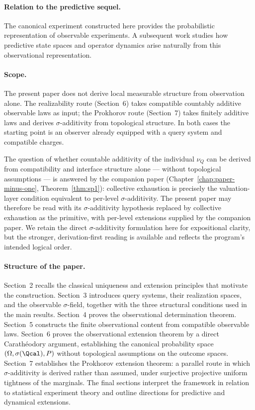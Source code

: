 \paragraph{Relation to the predictive sequel.}
The canonical experiment constructed here provides the probabilistic
representation of observable experiments.  A subsequent work studies
how predictive state spaces and operator dynamics arise naturally from
this observational representation.

\paragraph{Scope.}
The present paper does not derive local measurable structure from
observation alone. The realizability route (Section~6) takes
compatible countably additive observable laws as input; the Prokhorov
route (Section~7) takes finitely additive laws and derives
$\sigma$-additivity from topological structure.  In both cases the
starting point is an observer already equipped with a query system
and compatible charges.

The question of whether countable additivity of the individual
$\nu_Q$ can be derived from compatibility and interface structure
alone --- without topological assumptions --- is answered by the
companion paper (Chapter~\ref{chap:paper-minus-one}, Theorem~\ref{thm:sp1}):
collective exhaustion is precisely the valuation-layer condition
equivalent to per-level $\sigma$-additivity.  The present paper may
therefore be read with its $\sigma$-additivity hypothesis replaced by
collective exhaustion as the primitive, with per-level extensions
supplied by the companion paper.  We retain the direct
$\sigma$-additivity formulation here for expositional clarity, but
the stronger, derivation-first reading is available and reflects the
program's intended logical order.

\paragraph{Structure of the paper.}
Section~2 recalls the classical uniqueness and extension principles
that motivate the construction.  Section~3 introduces query systems,
their realization spaces, and the observable $\sigma$-field, together
with the three structural conditions used in the main results.
Section~4 proves the observational determination theorem.
Section~5 constructs the finite observational content from compatible
observable laws.  Section~6 proves the observational extension theorem
by a direct Carathéodory argument, establishing the canonical probability
space $(\Omega,\sigma(\Qcal),P)$ without topological assumptions on the
outcome spaces.  Section~7 establishes the Prokhorov extension theorem:
a parallel route in which $\sigma$-additivity is derived rather than
assumed, under surjective projective uniform tightness of the marginals.
The final sections interpret the framework in relation to statistical
experiment theory and outline directions for predictive and dynamical
extensions.


